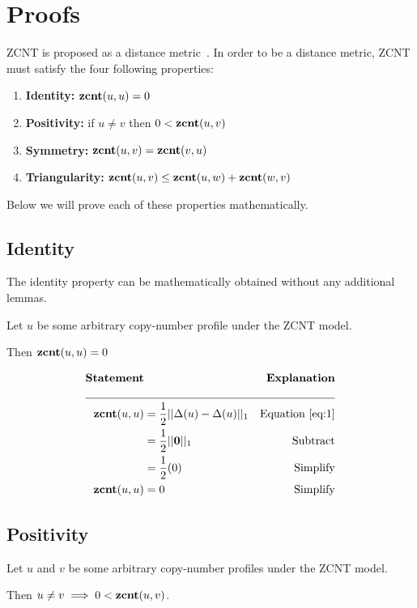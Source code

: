 \section{Proofs}

ZCNT is proposed as a distance metric~\cite{zcnt_paper}. In order to be a distance metric, ZCNT must satisfy the four following properties: 

\begin{enumerate}
    \item {\bf Identity:} $\textbf{zcnt} (u, u) = 0$
    \item {\bf Positivity:} if $u \neq v$ then $0 < \textbf{zcnt} (u, v)$
    \item {\bf Symmetry:} $\textbf{zcnt} (u, v) = \textbf{zcnt} (v, u)$
    \item {\bf Triangularity:} $\textbf{zcnt} (u, v) \leq \textbf{zcnt} (u, w) + \textbf{zcnt} (w, v)$
\end{enumerate}

Below we will prove each of these properties mathematically. 

\subsection{Identity}

The identity property can be mathematically obtained without any additional lemmas. 

\begin{theorem}
    Let $u$ be some arbitrary copy-number profile under the ZCNT model. 
    
    Then $\textbf{zcnt} (u, u) = 0$
\end{theorem}

\begin{align*}
    \textbf{Statement} & & \textbf{Explanation} \\
    \cline{1-3}
    \zcnt (u, u) &= \frac{1}{2} || \Delta(u) - \Delta(u) ||_1  & \text{Equation~\ref{eq:1}}\\ 
    &= \frac{1}{2} || \mathbf 0 ||_1 &\text{Subtract}\\ 
    &= \frac{1}{2} (0) &\text{Simplify} \\ 
    \zcnt (u, u) &= 0 &\text{Simplify}
\end{align*}

\subsection{Positivity}

\begin{theorem}
    Let $u$ and $v$ be some arbitrary copy-number profiles under the ZCNT model. 
    
    Then $u \neq v \implies 0 < \textbf{zcnt} (u, v)$.
\end{theorem}



